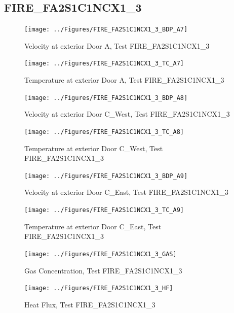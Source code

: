 \documentclass[11pt,oneside]{book}
\begin{document}
\clearpage


\subsection{FIRE\_FA2S1C1NCX1\_3}

\begin{figure}[!ht]
\texttt{[image: ../Figures/FIRE\_FA2S1C1NCX1\_3\_BDP\_A7]}
\caption{Velocity at exterior Door A, Test FIRE\_FA2S1C1NCX1\_3}
\label{fig:FIRE_FA2S1C1NCX1_3_BDP_A7}
\end{figure}

\begin{figure}[!ht]
\texttt{[image: ../Figures/FIRE\_FA2S1C1NCX1\_3\_TC\_A7]}
\caption{Temperature at exterior Door A, Test FIRE\_FA2S1C1NCX1\_3}
\label{fig:FIRE_FA2S1C1NCX1_3_TC_A7}
\end{figure}

\begin{figure}[!ht]
\texttt{[image: ../Figures/FIRE\_FA2S1C1NCX1\_3\_BDP\_A8]}
\caption{Velocity at exterior Door C\_West, Test FIRE\_FA2S1C1NCX1\_3}
\label{fig:FIRE_FA2S1C1NCX1_3_BDP_A8}
\end{figure}

\begin{figure}[!ht]
\texttt{[image: ../Figures/FIRE\_FA2S1C1NCX1\_3\_TC\_A8]}
\caption{Temperature at exterior Door C\_West, Test FIRE\_FA2S1C1NCX1\_3}
\label{fig:FIRE_FA2S1C1NCX1_3_TC_A8}
\end{figure}

\begin{figure}[!ht]
\texttt{[image: ../Figures/FIRE\_FA2S1C1NCX1\_3\_BDP\_A9]}
\caption{Velocity at exterior Door C\_East, Test FIRE\_FA2S1C1NCX1\_3}
\label{fig:FIRE_FA2S1C1NCX1_3_BDP_A9}
\end{figure}

\begin{figure}[!ht]
\texttt{[image: ../Figures/FIRE\_FA2S1C1NCX1\_3\_TC\_A9]}
\caption{Temperature at exterior Door C\_East, Test FIRE\_FA2S1C1NCX1\_3}
\label{fig:FIRE_FA2S1C1NCX1_3_TC_A9}
\end{figure}

\begin{figure}[!ht]
\texttt{[image: ../Figures/FIRE\_FA2S1C1NCX1\_3\_GAS]}
\caption{Gas Concentration, Test FIRE\_FA2S1C1NCX1\_3}
\label{fig:FIRE_FA2S1C1NCX1_3_GAS}
\end{figure}

\begin{figure}[!ht]
\texttt{[image: ../Figures/FIRE\_FA2S1C1NCX1\_3\_HF]}
\caption{Heat Flux, Test FIRE\_FA2S1C1NCX1\_3}
\label{fig:FIRE_FA2S1C1NCX1_3_HF}
\end{figure}
\end{document}

